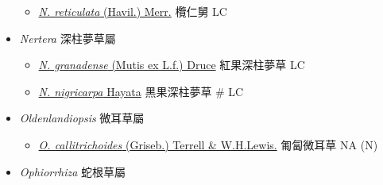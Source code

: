 \begin{itemize}
  \begin{itemize}
        \item[] \href{http://www.theplantlist.org/tpl1.1/search?q=Neonauclea+reticulata}{\textit{N. reticulata} (Havil.) Merr.}   欖仁舅   LC
  \end{itemize}
 \item[] \textit{Nertera} 深柱夢草屬
                                
  \begin{itemize}
        \item[] \href{http://www.theplantlist.org/tpl1.1/search?q=Nertera+granadense}{\textit{N. granadense} (Mutis ex L.f.) Druce}   紅果深柱夢草   LC
        \item[] \href{http://www.theplantlist.org/tpl1.1/search?q=Nertera+nigricarpa}{\textit{N. nigricarpa} Hayata}   黑果深柱夢草  \# LC
  \end{itemize}
 \item[] \textit{Oldenlandiopsis} 微耳草屬 
                                
  \begin{itemize}
        \item[] \href{http://www.theplantlist.org/tpl1.1/search?q=Oldenlandiopsis+callitrichoides}{\textit{O. callitrichoides} (Griseb.) Terrell \& W.H.Lewis.}   匍匐微耳草   NA (N)
  \end{itemize}
 \item[] \textit{Ophiorrhiza} 蛇根草屬
                                

\end{itemize}

